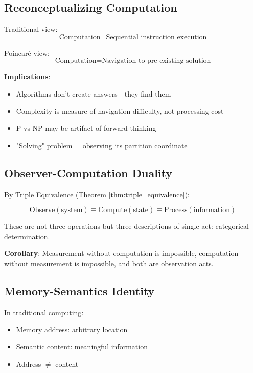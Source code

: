 \documentclass[twocolumn,10pt]{article}
\begin{document}
\subsection{Reconceptualizing Computation}

Traditional view:
\begin{equation}
\text{Computation} = \text{Sequential instruction execution}
\end{equation}

Poincaré view:
\begin{equation}
\text{Computation} = \text{Navigation to pre-existing solution}
\end{equation}

\textbf{Implications}:
\begin{itemize}
\item Algorithms don't create answers—they find them
\item Complexity is measure of navigation difficulty, not processing cost
\item P vs NP may be artifact of forward-thinking
\item "Solving" problem = observing its partition coordinate
\end{itemize}

\subsection{Observer-Computation Duality}

By Triple Equivalence (Theorem \ref{thm:triple_equivalence}):

\begin{equation}
\text{Observe}(\text{system}) \equiv \text{Compute}(\text{state}) \equiv \text{Process}(\text{information})
\end{equation}

These are not three operations but three descriptions of single act: categorical determination.

\textbf{Corollary}: Measurement without computation is impossible, computation without measurement is impossible, and both are observation acts.

\subsection{Memory-Semantics Identity}

In traditional computing:
\begin{itemize}
\item Memory address: arbitrary location
\item Semantic content: meaningful information
\item Address $\neq$ content
\end{itemize}
\end{document}
